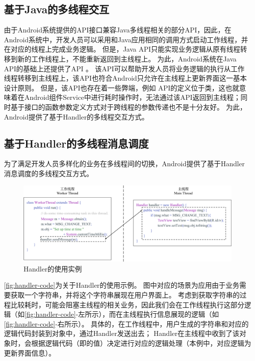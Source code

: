 \subsection{基于Java的多线程交互}

由于Android系统提供的API接口兼容Java多线程相关的部分API，因此，在Android系统中，开发人员可以采用和Java应用相同的调用方式启动工作线程，并在对应的线程上完成业务逻辑。
但是，Java API只能实现业务逻辑从原有线程转移到新的工作线程上，不能重新返回到主线程上。
为此，Android系统在Java API的基础上还提供了API 。
该API可以帮助开发人员将业务逻辑的执行从工作线程转移到主线程上，该API也符合Android只允许在主线程上更新界面这一基本设计原则。
但是，该API也存在着一些弊端，例如 API的定义位于类，这也就意味着在Android组件Service中进行耗时操作时，无法通过该API返回到主线程；同时基于接口的函数参数定义方式对于跨线程的参数传递也不是十分友好。
为此，Android提供了基于Handler的多线程交互方式。

\subsection{基于Handler的多线程消息调度}

为了满足开发人员多样化的业务在多线程间的切换，Android提供了基于Handler消息调度的多线程交互方式。



\begin{figure}[h]
	\centering
	\includegraphics[width=\textwidth]{./Figures/handler-code.png}
	\caption{Handler的使用实例}
	\label{fig:handler-code}
\end{figure}


\autoref{fig:handler-code}为关于Handler的使用示例。
图中对应的场景为应用由于业务需要获取一个字符串，并将这个字符串展现在用户界面上。
考虑到获取字符串的过程比较耗时，可能会阻塞主线程的相关业务，因此我们会在工作线程执行这部分逻辑（如\autoref{fig:handler-code}-左所示），而在主线程执行信息展现的逻辑（如\autoref{fig:handler-code}-右所示）。
具体的，在工作线程中，用户生成的字符串和对应的逻辑代码封装到对象中，通过Handler发送出去；
Handler在主线程中收到了该对象时，会根据逻辑代码（即的值）决定进行对应的逻辑处理（本例中，对应逻辑为更新界面信息）。


